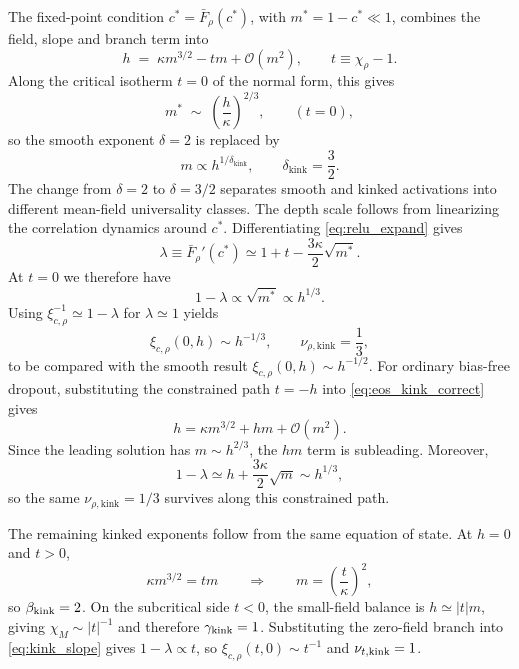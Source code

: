 The fixed-point condition \(c^*=\bar F_\rho(c^*)\), with \(m^*=1-c^*\ll1\), combines the field, slope and branch term into
\begin{equation}
h \;=\; \kappa m^{3/2} - t m + \mathcal O(m^2), \qquad t\equiv \chi_\rho-1.
\label{eq:eos_kink_correct}
\end{equation}
Along the critical isotherm \(t=0\) of the normal form, this gives
\begin{equation}
m^* \;\sim\; \left(\frac{h}{\kappa}\right)^{2/3}, \qquad (t=0),
\label{eq:kink_mstar}
\end{equation}
so the smooth exponent \(\delta=2\) is replaced by
\begin{equation}
m \propto h^{1/\delta_{\mathrm{kink}}}, \qquad \delta_{\mathrm{kink}}=\frac{3}{2}.
\label{eq:kink_delta}
\end{equation}
The change from $\delta=2$ to $\delta=3/2$ separates smooth and kinked activations into different mean-field universality classes. The depth scale follows from linearizing the correlation dynamics around \(c^*\). Differentiating \eqref{eq:relu_expand} gives
\begin{equation}
\lambda \equiv \bar F_\rho'(c^*) \simeq 1+t-\frac{3\kappa}{2}\sqrt{m^*}.
\label{eq:kink_slope}
\end{equation}
At \(t=0\) we therefore have
\begin{equation}
1-\lambda \propto \sqrt{m^*}\propto h^{1/3}.
\end{equation}
Using \(\xi_{c,\rho}^{-1}\simeq 1-\lambda\) for \(\lambda\simeq 1\) yields
\begin{equation}
\xi_{c,\rho}(0,h) \sim h^{-1/3}, \qquad \nu_{\rho,\mathrm{kink}}=\frac{1}{3},
\label{eq:kink_nu}
\end{equation}
to be compared with the smooth result \(\xi_{c,\rho}(0,h)\sim h^{-1/2}\).
For ordinary bias-free \relu{} dropout, substituting the constrained path \(t=-h\) into \eqref{eq:eos_kink_correct} gives
\begin{equation}
h=\kappa m^{3/2}+hm+\mathcal O(m^2).
\end{equation}
Since the leading solution has \(m\sim h^{2/3}\), the \(hm\) term is subleading. Moreover,
\begin{equation}
1-\lambda\simeq h+\frac{3\kappa}{2}\sqrt m\sim h^{1/3},
\end{equation}
so the same \(\nu_{\rho,\mathrm{kink}}=1/3\) survives along this constrained path.

The remaining kinked exponents follow from the same equation of state. At \(h=0\) and \(t>0\),
\begin{equation}
\kappa m^{3/2}=tm \qquad\Rightarrow\qquad m=\left(\frac{t}{\kappa}\right)^2,
\end{equation}
so \(\beta_{\rm kink}=2\). On the subcritical side \(t<0\), the small-field balance is \(h\simeq |t|m\), giving \(\chi_M\sim |t|^{-1}\) and therefore \(\gamma_{\rm kink}=1\). Substituting the zero-field branch into \eqref{eq:kink_slope} gives \(1-\lambda\propto t\), so \(\xi_{c,\rho}(t,0)\sim t^{-1}\) and \(\nu_{t,\rm kink}=1\).

